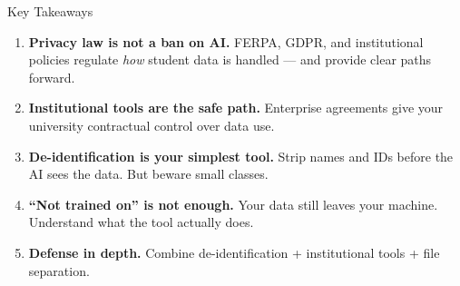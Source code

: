 \documentclass[aspectratio=169, 10pt]{beamer}
\begin{document}
\begin{frame}{Key Takeaways}

\begin{enumerate}\small
  \item \textbf{Privacy law is not a ban on AI.} FERPA, GDPR, and institutional policies regulate \textit{how} student data is handled --- and provide clear paths forward.

  \vspace{0.15cm}

  \item \textbf{Institutional tools are the safe path.} Enterprise agreements give your university contractual control over data use.

  \vspace{0.15cm}

  \item \textbf{De-identification is your simplest tool.} Strip names and IDs before the AI sees the data. But beware small classes.

  \vspace{0.15cm}

  \item \textbf{``Not trained on'' is not enough.} Your data still leaves your machine. Understand what the tool actually does.

  \vspace{0.15cm}

  \item \textbf{Defense in depth.} Combine de-identification + institutional tools + file separation.
\end{enumerate}

\end{frame}
\end{document}
